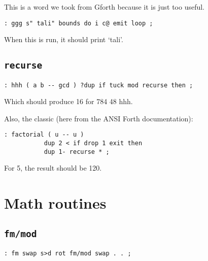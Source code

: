 This is a word we took from Gforth because it is just too useful.

\begin{lstlisting}[frame=lines]
        : ggg s" tali" bounds do i c@ emit loop ;
\end{lstlisting}

\noindent When this is run, it should print `tali'.



\subsection{\texttt{recurse}}

\begin{lstlisting}[frame=lines]
        : hhh ( a b -- gcd ) ?dup if tuck mod recurse then ;
\end{lstlisting}

\noindent Which should produce 16 for 784 48 hhh. 


Also, the classic (here from the ANSI Forth documentation):

\begin{lstlisting}[frame=lines]
        : factorial ( u -- u ) 
           dup 2 < if drop 1 exit then 
           dup 1- recurse * ;
\end{lstlisting}

\noindent For 5, the result should be 120.



\section{Math routines}



\subsection{\texttt{fm/mod}}

\begin{lstlisting}[frame=lines]
        : fm swap s>d rot fm/mod swap . . ; 
\end{lstlisting}

